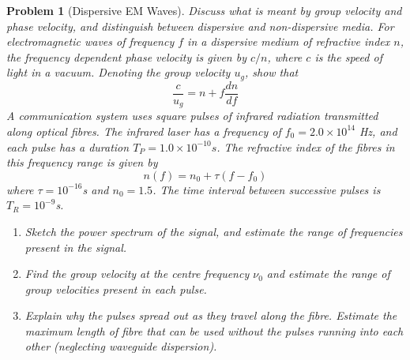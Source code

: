 \documentclass[a4paper]{article}
\theoremstyle{new}
\newtheorem{qns}{Problem}[section]
\begin{document}
\begin{qns}[Dispersive EM Waves]
Discuss what is meant by group velocity and phase velocity, and distinguish between dispersive and non-dispersive media. For electromagnetic waves of frequency $f$ in a dispersive medium of refractive index $n$, the frequency dependent phase velocity is given by $c/n$, where $c$ is the speed of light in a vacuum. Denoting the group velocity $u_g$, show that
$$\frac{c}{u_g}=n+f\frac{dn}{df}$$
A communication system uses square pulses of infrared radiation transmitted along optical fibres. The infrared laser has a frequency of $f_0=2.0\times10^{14}$ Hz, and each pulse has a duration $T_P=1.0\times10^{-10}s$. The refractive index of the fibres in this frequency range is given by
$$n(f)=n_0+\tau(f-f_0)$$
where $\tau=10^{-16}$s and $n_0=1.5$. The time interval between successive pulses is $T_R=10^{-9}$s.
\begin{enumerate}[label=(\alph*)]
    \item Sketch the power spectrum of the signal, and estimate the range of frequencies present in the signal.
    \item Find the group velocity at the centre frequency $\nu_0$ and estimate the range of group velocities present in each pulse.
    \item Explain why the pulses spread out as they travel along the fibre. Estimate the maximum length of fibre that can be used without the pulses running into each other (neglecting waveguide dispersion).
\end{enumerate}
\end{qns}
\end{document}
